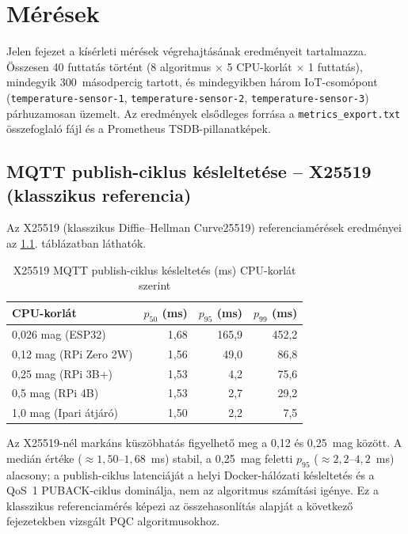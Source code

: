 \chapter{Mérések}

Jelen fejezet a kísérleti mérések végrehajtásának eredményeit tartalmazza. Összesen 40 futtatás történt (8 algoritmus $\times$
5 CPU-korlát $\times$ 1 futtatás), mindegyik 300~másodpercig tartott, és mindegyikben
három IoT-csomópont (\texttt{temperature-sensor-1}, \texttt{temperature-sensor-2}, \texttt{temperature-sensor-3}) párhuzamosan
üzemelt. Az eredmények elsődleges forrása a \texttt{metrics\_export.txt} összefoglaló
fájl és a Prometheus TSDB-pillanatképek.

\section{MQTT publish-ciklus késleltetése -- X25519 (klasszikus referencia)}

Az X25519 (klasszikus Diffie--Hellman Curve25519) referenciamérések eredményei az
\ref{tab:x25519-latency}. táblázatban láthatók.

\begin{table}[ht]
\centering
\caption{X25519 MQTT publish-ciklus késleltetés (ms) CPU-korlát szerint}
\label{tab:x25519-latency}
\begin{tabular}{lrrr}
\hline
\textbf{CPU-korlát} & \textbf{$p_{50}$ (ms)} & \textbf{$p_{95}$ (ms)} & \textbf{$p_{99}$ (ms)} \\
\hline
0,026 mag (ESP32)        & 1,68 & 165,9 & 452,2 \\
0,12 mag (RPi Zero 2W)  & 1,56 &  49,0 &  86,8 \\
0,25 mag (RPi 3B+)      & 1,53 &   4,2 &  75,6 \\
0,5 mag (RPi 4B)        & 1,53 &   2,7 &  29,2 \\
1,0 mag (Ipari átjáró)  & 1,50 &   2,2 &   7,5 \\
\hline
\end{tabular}
\end{table}

Az X25519-nél markáns küszöbhatás figyelhető meg a 0,12 és 0,25~mag között. A medián
értéke ($\approx 1{,}50$--$1{,}68$~ms) stabil, a 0,25~mag feletti $p_{95}$
($\approx 2{,}2$--$4{,}2$~ms) alacsony; a publish-ciklus latenciáját a helyi
Docker-hálózati késleltetés és a QoS~1 PUBACK-ciklus dominálja, nem az algoritmus
számítási igénye. Ez a klasszikus referenciamérés képezi az összehasonlítás alapját
a következő fejezetekben vizsgált PQC algoritmusokhoz.

